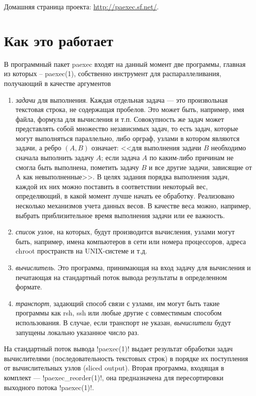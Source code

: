 \documentclass[10pt, a5paper]{article}
\begin{document}
Домашняя страница проекта: \url{http://paexec.sf.net/}.

\section*{Как это работает}
В программный пакет paexec входят на данный момент
две программы, главная из которых -- paexec(1), собственно инструмент для
распараллеливания, получающий в качестве аргументов
\begin{enumerate}
\item \emph{задачи} для выполнения. Каждая отдельная задача --- это
   произвольная текстовая строка, не содержащая пробелов. Это может
   быть, например, имя файла, формула для вычисления и
   т.п. Совокупность же задач может представлять собой множество
   независимых задач, то есть задач, которые могут выполняться
   параллельно, либо орграф, узлами в котором являются задачи, а ребро
   $(A, B)$ означает: <<для выполнения задачи $B$ необходимо сначала
   выполнить задачу $A$; если задача $A$ по каким-либо причинам не смогла
   быть выполнена, пометить задачу $B$ и все другие задачи, зависящие от
   A как невыполненные>>. В целях задания порядка выполнения задач,
   каждой их них можно поставить в соответствии некоторый вес,
   определяющий, в какой момент лучше начать ее обработку. Реализовано
   несколько механизмов учета данных весов. В качестве веса можно,
   например, выбрать приблизительное время выполнения задачи или ее
   важность.
\item \emph{список узлов}, на которых, будут производится вычисления, узлами
   могут быть, например, имена компьютеров в сети или номера процессоров,
   адреса chroot пространств на UNIX-системе и т.д.
\item \emph{вычислитель}. Это программа, принимающая на вход задачу для
   вычисления и печатающая на стандартный поток вывода результаты в
   определенном формате.
\item \emph{транспорт}, задающий способ связи с узлами, им могут быть такие
   программы как rsh, ssh или любые другие с совместимым способом
   использования. В случае, если транспорт не указан, \emph{вычислители}
   будут запущены локально указанное число раз.
\end{enumerate}

На стандартный поток вывода \progref!paexec(1)! выдает результат обработки задач
вычислителями (последовательность текстовых строк) в порядке их
поступления от вычислительных узлов (sliced output). Вторая программа,
входящая в комплект --- \progref!paexec\_re\-order(1)!, она предназначена для
пересортировки выходного потока \progref!paexec(1)!.
\end{document}
